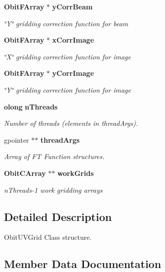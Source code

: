 \begin{CompactItemize}
{\bf Obit\-FArray} $\ast$ {\bf y\-Corr\-Beam}
\begin{CompactList}\small\item\em \char`\"{}Y\char`\"{} gridding correction function for beam \item\end{CompactList}\item 
{\bf Obit\-FArray} $\ast$ {\bf x\-Corr\-Image}
\begin{CompactList}\small\item\em \char`\"{}X\char`\"{} gridding correction function for image \item\end{CompactList}\item 
{\bf Obit\-FArray} $\ast$ {\bf y\-Corr\-Image}
\begin{CompactList}\small\item\em \char`\"{}Y\char`\"{} gridding correction function for image \item\end{CompactList}\item 
{\bf olong} {\bf n\-Threads}
\begin{CompactList}\small\item\em Number of threads (elements in thread\-Args). \item\end{CompactList}\item 
gpointer $\ast$$\ast$ {\bf thread\-Args}
\begin{CompactList}\small\item\em Array of FT Function structures. \item\end{CompactList}\item 
{\bf Obit\-CArray} $\ast$$\ast$ {\bf work\-Grids}
\begin{CompactList}\small\item\em n\-Threads-1 work gridding arrays \item\end{CompactList}\end{CompactItemize}


\subsection{Detailed Description}
Obit\-UVGrid Class structure. 



\subsection{Member Data Documentation}
